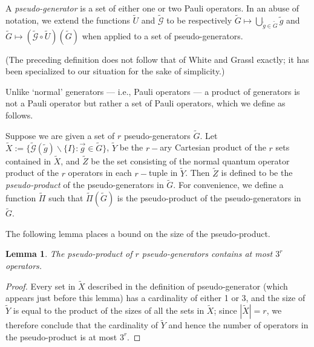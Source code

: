 \documentclass[twocolumn,showpacs,preprintnumbers,amsmath,amssymb,nofootinbib,pra,floatfix]{revtex4-1}
\newtheorem{lemma}{Lemma}
\newenvironment{definition}[1][Definition]{\begin{trivlist}
\item[\hskip \labelsep {\bfseries #1}]}{\end{trivlist}}
\newenvironment{remark}[1][Remark]{\begin{trivlist}
\item[\hskip \labelsep {\bfseries #1}]}{\end{trivlist}}
\newcommand{\lst}{\vec}
\newcommand{\set}{\tilde}
\newcommand{\genfun}{\tilde{\mathcal{G}}}
\newcommand{\pseudoproduct}{\set\Pi}
\begin{document}
\begin{definition}
A \emph{pseudo-generator} is a set of either one or two Pauli operators.  In an abuse of notation, we extend the functions $\set U$ and $\genfun$ to be respectively $\set G\mapsto \bigcup_{\set g\in\set G} \set g$ and $\set G\mapsto (\genfun\circ\set U)(\set G)$ when applied to a set of pseudo-generators.
\end{definition}
\begin{remark}
(The preceding definition does not follow that of White and Grassl exactly; it has been specialized to our situation for the sake of simplicity.)

Unlike `normal' generators --- i.e., Pauli operators --- a product of generators is not a Pauli operator but rather a set of Pauli operators, which we define as follows.
\end{remark}

\begin{definition}
Suppose we are given a set of $r$ pseudo-generators $\set G$.  Let $\set X:=\{\genfun(\set g)\backslash\{I\}: \lst g\in\set G\}$, $\set Y$ be the $r-$ary Cartesian product of the $r$ sets contained in $\set X$, and $\set Z$ be the set consisting of the normal quantum operator product of the $r$ operators in each $r-$tuple in $\set Y$.  Then $\set Z$ is defined to be the \emph{pseudo-product} of the pseudo-generators in $\set G$.  For convenience, we define a function $\pseudoproduct$ such that $\pseudoproduct(\set G)$ is the pseudo-product of the pseudo-generators in $\set G$.
\end{definition}

\begin{remark}
The following lemma places a bound on the size of the pseudo-product.
\end{remark}

\begin{lemma}
\label{lemma:bound-on-pseudo-product}
The pseudo-product of $r$ pseudo-generators contains at most $3^r$ operators.
\end{lemma}

\begin{proof}
Every set in $\set X$ described in the definition of pseudo-generator (which appears just before this lemma) has a cardinality of either 1 or 3, and the size of $\set Y$ is equal to the product of the sizes of all the sets in $\set X$;  since $|\set X|=r$, we therefore conclude that the cardinality of $\set Y$ and hence the number of operators in the pseudo-product is at most $3^r$.
\end{proof}
\end{document}
